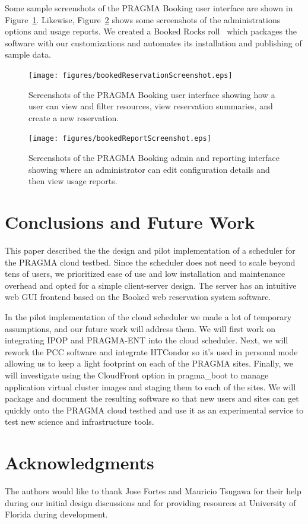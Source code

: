 \documentclass[times]{cpeauth}
\begin{document}
Some sample screenshots of the PRAGMA Booking user interface are shown in Figure~\ref{Fig:Booked}.  Likewise, Figure~\ref{Fig:Reports} shows some screenshots of the administrations options and usage reports.  We created a  Booked Rocks roll~\cite{cloudscheduler} which packages the software with our customizations and automates its installation and publishing of sample data.

\begin{figure}[htbp] 
\begin{center}
\texttt{[image: figures/bookedReservationScreenshot.eps]}
\caption{Screenshots of the PRAGMA Booking user interface showing how a user can view and filter resources, view reservation summaries, and create a new reservation.}
\label{Fig:Booked}
\end{center}
\end{figure}

\begin{figure}[htbp]
\begin{center}
\texttt{[image: figures/bookedReportScreenshot.eps]}
\caption{Screenshots of the PRAGMA Booking admin and reporting interface showing where an administrator can edit configuration details and then view usage reports.}
\label{Fig:Reports}
\end{center}
\end{figure}

\section{Conclusions and Future Work}
\label{Sec:Conclusions}

This paper described the the design and pilot implementation of a  scheduler for the PRAGMA cloud testbed.  Since the scheduler does not need to scale beyond tens of users, we prioritized ease of use and low installation and maintenance overhead and opted for a simple client-server design.  The server has an intuitive web GUI frontend based on the Booked web reservation system software.  

In the pilot implementation of the cloud scheduler  we made a lot of temporary assumptions, and  our future work will address them.  We will first work on integrating IPOP and PRAGMA-ENT into the cloud scheduler.  Next, we will rework the PCC software and integrate HTCondor so it's used in personal mode allowing us to keep a light footprint on each of the PRAGMA sites.  Finally, we will investigate using the CloudFront option in pragma\_boot to manage application virtual cluster images and staging them to each of the sites.     We will package and document the resulting software so that new users and sites can get quickly onto the PRAGMA cloud testbed and use it as an experimental service to test new science and infrastructure tools.


\section{Acknowledgments}

The authors would like to thank Jose Fortes and Mauricio Tsugawa for their help during our initial design discussions and for providing resources at University of Florida during development.


  
\end{document}

